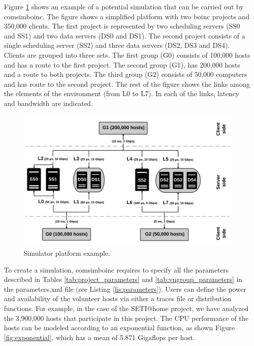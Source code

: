 \begin{appendices}
Figure \ref{fig:interaction} shows an example of a potential simulation that can be carried out by \gls{comsimboinc}. The figure shows a simplified platform with two \gls{boinc} projects and 350,000 clients. The first project is represented by two \gls{scheduling} servers (SS0 and SS1) and two data servers (DS0 and DS1). The second project consists of a single \gls{scheduling} server (SS2) and three data servers (DS2, DS3 and DS4). Clients are grouped into three sets. The first group (G0) consists of 100,000 hosts and has a route to the first project. The second group (G1), has 200,000 hosts and a route to both projects. The third group (G2) consists of 50,000 computers and has route to the second project. The rest of the figure shows the links among the elements of the environment (from L0 to L7). In each of the links, latency and bandwidth are indicated.

\begin{figure}[htbp]
    \centering
    \includegraphics[width=13.5cm]{figures/interaction}
    \caption{Simulator platform example.}
    \label{fig:interaction}
\end{figure}

To create a simulation, \gls{comsimboinc} requires to specify all the parameters described in Tables \ref{tab:project_parameters} and \ref{tab:vngroup_parameters} in the parameters.xml file (see Listing \ref{lis:parameters}). Users can define the power and availability of the volunteer hosts via either a traces file or distribution functions. For example, in the case of the SETI@home project, we have analyzed the 3,900,000 hosts that participate in this project. The CPU performance of the hosts can be modeled according to an exponential function, as shown Figure \ref{fig:exponential}, which has a mean of 5.871 Giga\acrshort{flops} per host.


\end{appendices}
